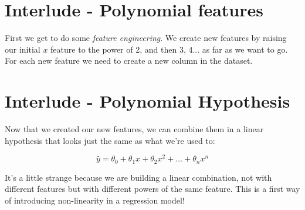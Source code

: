 \section*{Interlude - Polynomial features}
First we get to do some \textit{feature engineering}.
We create new features by raising our initial $x$ feature to the power of 2, and then 3, 4... as far as we want to go.
For each new feature we need to create a new column in the dataset.

\section*{Interlude - Polynomial Hypothesis}
Now that we created our new features, we can combine them in a linear hypothesis that looks just the same as what we're used to:

$$
\hat{y} = \theta_0 + \theta_1 x  +\theta_2 x^{2} + \dots + \theta_n x^{n}
$$  

It's a little strange because we are building a linear combination, not with different features but with different powers of the same feature.
This is a first way of introducing non-linearity in a regression model!